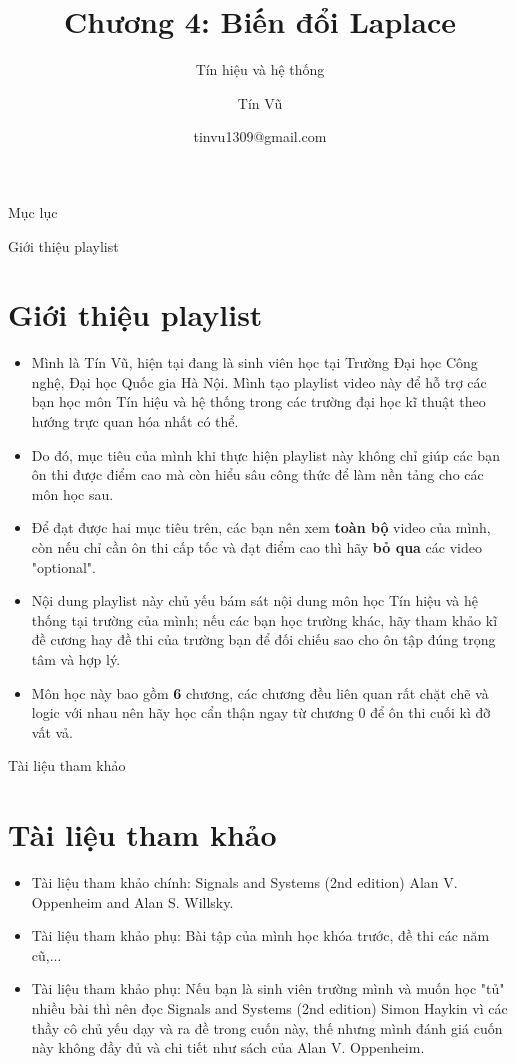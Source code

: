 \documentclass[8pt]{beamer}
\title[Chương 4: Biến đổi Laplace] %
{Chương 4: Biến đổi Laplace}
\subtitle{Tín hiệu và hệ thống}
\author[Tín hiệu và hệ thống] %
{Tín Vũ}
\date[VLC 2021] %
{tinvu1309@gmail.com}
\begin{document}
\frame{\titlepage}
\begin{frame}{Mục lục}
\tableofcontents
\end{frame}
\begin{frame}{Giới thiệu playlist}
\section{Giới thiệu playlist}
	\begin{itemize}
		\item Mình là Tín Vũ, hiện tại đang là sinh viên học tại Trường Đại học Công nghệ, Đại học Quốc gia Hà Nội. Mình tạo playlist video này để hỗ trợ các bạn học môn Tín hiệu và hệ thống trong các trường đại học kĩ thuật theo hướng \alert{trực quan hóa} nhất có thể.
		\item Do đó, mục tiêu của mình khi thực hiện playlist này không chỉ giúp các bạn ôn thi được điểm cao mà còn \alert{hiểu sâu công thức để làm nền tảng cho các môn học sau}.
		\item Để đạt được hai mục tiêu trên, các bạn nên xem \textbf{toàn bộ} video của mình, còn nếu chỉ cần ôn thi cấp tốc và đạt điểm cao thì hãy \textbf{bỏ qua} các video "optional".
		\item Nội dung playlist này chủ yếu bám sát nội dung môn học Tín hiệu và hệ thống tại trường của mình; nếu các bạn học trường khác, hãy tham khảo kĩ đề cương hay đề thi của trường bạn để đối chiếu sao cho ôn tập đúng trọng tâm và hợp lý. 
		\item Môn học này bao gồm \textbf{6} chương, các chương đều liên quan rất chặt chẽ và logic với nhau nên hãy học cẩn thận ngay từ \alert{chương 0} để ôn thi cuối kì đỡ vất vả.
	\end{itemize}
\end{frame}
\begin{frame}{Tài liệu tham khảo}
\section{Tài liệu tham khảo}
\begin{itemize}
		\item Tài liệu tham khảo chính: Signals and Systems (2nd edition) Alan V. Oppenheim and Alan S. Willsky.
		\item Tài liệu tham khảo phụ: Bài tập của mình học khóa trước, đề thi các năm cũ,...
		\item Tài liệu tham khảo phụ: Nếu bạn là sinh viên trường mình và muốn học "tủ" nhiều bài thì nên đọc Signals and Systems (2nd edition) Simon Haykin vì các thầy cô chủ yếu dạy và ra đề trong cuốn này, thế nhưng mình đánh giá cuốn này không đầy đủ và chi tiết như sách của Alan V. Oppenheim. 
	\end{itemize}
\end{frame}
\end{document}
